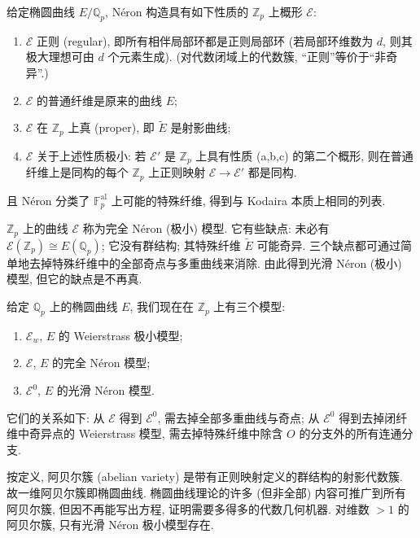 给定椭圆曲线 $E/\mathbb{Q}_p$, N\'eron 构造具有如下性质的 $\mathbb{Z}_p$ 上概形 $\mathcal{E}$:
\begin{enumerate}[label=\textup{(\alph*)}]
\item $\mathcal{E}$ 正则 (regular), 即所有相伴局部环都是正则局部环 (若局部环维数为 $d$, 则其极大理想可由 $d$ 个元素生成). (对代数闭域上的代数簇, ``正则''等价于``非奇异''.)
\item $\mathcal{E}$ 的普通纤维是原来的曲线 $E$;
\item $\mathcal{E}$ 在 $\mathbb{Z}_p$ 上真 (proper), 即 $\tilde{E}$ 是射影曲线;
\item $\mathcal{E}$ 关于上述性质极小: 若 $\mathcal{E}'$ 是 $\mathbb{Z}_p$ 上具有性质 (a,b,c) 的第二个概形, 则在普通纤维上是同构的每个 $\mathbb{Z}_p$ 上正则映射 $\mathcal{E}\to\mathcal{E}'$ 都是同构.
\end{enumerate}
且 N\'eron 分类了 $\mathbb{F}_p^{\mathrm{al}}$ 上可能的特殊纤维, 得到与 Kodaira 本质上相同的列表.

$\mathbb{Z}_p$ 上的曲线 $\mathcal{E}$ 称为完全 N\'eron (极小) 模型. 它有些缺点: 未必有 $\mathcal{E}(\mathbb{Z}_p)\cong E(\mathbb{Q}_p)$; 它没有群结构; 其特殊纤维 $\tilde{E}$ 可能奇异. 三个缺点都可通过简单地去掉特殊纤维中的全部奇点与多重曲线来消除. 由此得到光滑 N\'eron (极小) 模型, 但它的缺点是不再真.

给定 $\mathbb{Q}_p$ 上的椭圆曲线 $E$, 我们现在在 $\mathbb{Z}_p$ 上有三个模型:
\begin{enumerate}[label=\textup{(\alph*)}]
\item $\mathcal{E}_w$, $E$ 的 Weierstrass 极小模型;
\item $\mathcal{E}$, $E$ 的完全 N\'eron 模型;
\item $\mathcal{E}^0$, $E$ 的光滑 N\'eron 模型.
\end{enumerate}
它们的关系如下: 从 $\mathcal{E}$ 得到 $\mathcal{E}^0$, 需去掉全部多重曲线与奇点; 从 $\mathcal{E}^0$ 得到去掉闭纤维中奇异点的 Weierstrass 模型, 需去掉特殊纤维中除含 $O$ 的分支外的所有连通分支.

\begin{aside} \label{thm:2.7.3} 
按定义, 阿贝尔簇 (abelian variety) 是带有正则映射定义的群结构的射影代数簇. 故一维阿贝尔簇即椭圆曲线. 椭圆曲线理论的许多 (但非全部) 内容可推广到所有阿贝尔簇, 但因不再能写出方程, 证明需要多得多的代数几何机器. 对维数 $> 1$ 的阿贝尔簇, 只有光滑 N\'eron 极小模型存在.
\end{aside}

